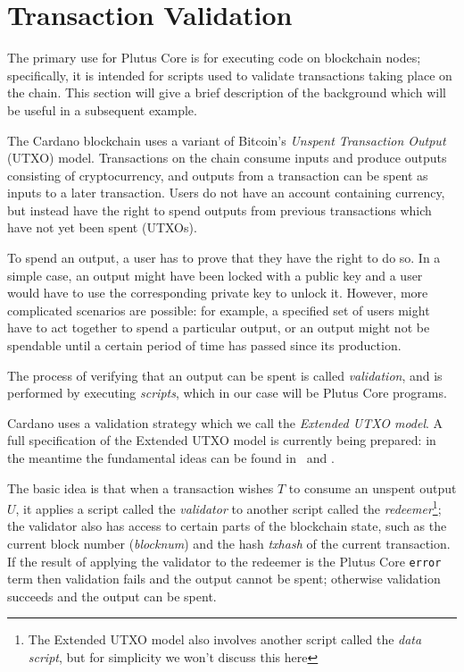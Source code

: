 \documentclass[a4paper]{article}
\begin{document}
\section{Transaction Validation}
The primary use for Plutus Core is for executing code on blockchain
nodes; specifically, it is intended for scripts used to validate
transactions taking place on the chain.  This section will give a
brief description of the background which will be useful in a
subsequent example.

The Cardano blockchain uses a variant of Bitcoin's \textit{Unspent
  Transaction Output} (UTXO) model.  Transactions on the chain consume
inputs and produce outputs consisting of cryptocurrency, and outputs
from a transaction can be spent as inputs to a later transaction.
Users do not have an account containing currency, but instead have the
right to spend outputs from previous transactions which have not yet
been spent (UTXOs).

To spend an output, a user has to prove that they have the right to do
so.  In a simple case, an output might have been locked with a public
key and a user would have to use the corresponding private key to
unlock it.  However, more complicated scenarios are possible: for
example, a specified set of users might have to act together to spend
a particular output, or an output might not be spendable until a
certain period of time has passed since its production.

The process of verifying that an output can be spent is called
\textit{validation}, and is performed by executing \textit{scripts},
which in our case will be Plutus Core programs.


Cardano uses a validation strategy which we call the \textit{Extended
  UTXO model}.  A full specification of the Extended UTXO model is
currently being prepared: in the meantime the fundamental ideas can be
found in~\citep{Zahnentferner18-Chimeric} and
\citep{Zahnentferner18-UTxO}.

The basic idea is that when a transaction wishes $T$ to consume an
unspent output $U$, it applies a script called the \textit{validator}
to another script called the \textit{redeemer}\footnote{The Extended
  UTXO model also involves another script called the \textit{data
    script}, but for simplicity we won't discuss this here}; the
validator also has access to certain parts of the blockchain state,
such as the current block number (\textit{blocknum}) and the hash
\textit{txhash} of the current transaction.  If the result of applying
the validator to the redeemer is the Plutus Core \texttt{error} term
then validation fails and the output cannot be spent; otherwise
validation succeeds and the output can be spent.
\end{document}
